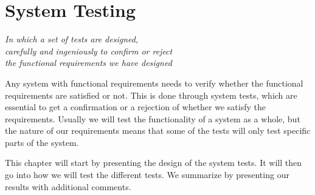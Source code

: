 \chapter{System Testing}\label{ch:sys-test}

\begin{flushright}{\slshape
    In which a set of tests are designed,\\
    carefully and ingeniously to confirm or reject\\
    the functional requirements we have designed
}
\end{flushright}

Any system with functional requirements needs to verify whether the functional
requirements are satisfied or not. This is done through system tests, which are
essential to get a confirmation or a rejection of whether we satisfy the
requirements. Usually we will test the functionality of a system as a whole, but
the nature of our requirements means that some of the tests will only test
specific parts of the system.

This chapter will start by presenting the design of the system tests. It will
then go into how we will test the different tests. We summarize by presenting
our results with additional comments.




